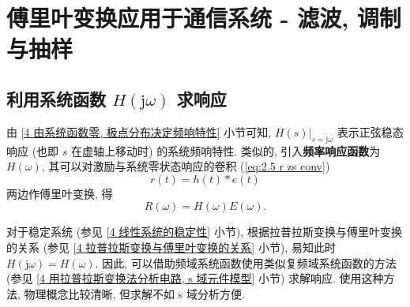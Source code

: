 \section{傅里叶变换应用于通信系统 - 滤波, 调制与抽样} \label{傅里叶变换应用于通信系统 - 滤波, 调制与抽样}
\subsection{利用系统函数 \texorpdfstring{$H(\mathrm{j}\omega)$}{H(j omega)} 求响应} \label{5 利用系统函数 H(j omega) 求响应}
由 \ref{4 由系统函数零, 极点分布决定频响特性} 小节可知, $H(s)|_{s=\mathrm{j}\omega}$ 表示正弦稳态响应 (也即 $s$ 在虚轴上移动时) 的系统频响特性. 类似的, 引入\textbf{频率响应函数}为 $H(\omega)$, 其可以对激励与系统零状态响应的卷积 (\ref{eq:2.5 r zs conv})
\begin{equation}
    r(t)=h(t)*e(t)
\end{equation}
两边作傅里叶变换, 得
\begin{equation}
    R(\omega)=H(\omega)E(\omega).
\end{equation}

对于稳定系统 (参见 \ref{4 线性系统的稳定性} 小节), 根据拉普拉斯变换与傅里叶变换的关系 (参见 \ref{4 拉普拉斯变换与傅里叶变换的关系} 小节), 易知此时 $H(\mathrm{j}\omega)=H(\omega)$. 因此, 可以借助频域系统函数使用类似复频域系统函数的方法 (参见 \ref{4 用拉普拉斯变换法分析电路, s 域元件模型} 小节) 求解响应. 使用这种方法, 物理概念比较清晰, 但求解不如 s 域分析方便.
